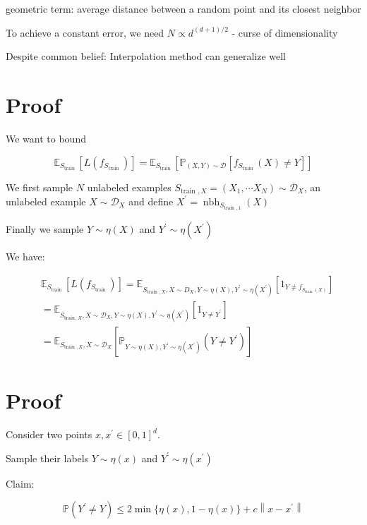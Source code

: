 \documentclass[10pt]{article}
\begin{document}
geometric term: average distance between a random point and its closest neighbor

To achieve a constant error, we need $N \propto d^{(d+1) / 2}$ - curse of dimensionality

Despite common belief: Interpolation method can generalize well

\section*{Proof}
We want to bound

$$
\mathbb{E}_{S_{\text {train }}}\left[L\left(f_{S_{\text {train }}}\right)\right]=\mathbb{E}_{S_{\text {train }}}\left[\mathbb{P}_{(X, Y) \sim \mathscr{D}}\left[f_{S_{\text {train }}}(X) \neq Y\right]\right]
$$

We first sample $N$ unlabeled examples $S_{\text {train }, X}=\left(X_{1}, \cdots X_{N}\right) \sim \mathscr{D}_{X}$, an unlabeled example $X \sim \mathscr{D}_{X}$ and define $X^{\prime}=\operatorname{nbh}_{S_{\text {train }, 1}}(X)$

Finally we sample $Y \sim \eta(X)$ and $Y^{\prime} \sim \eta\left(X^{\prime}\right)$

We have:

$$
\begin{aligned}
& \mathbb{E}_{S_{\text {train }}}\left[L\left(f_{S_{\text {train }}}\right)\right]=\mathbb{E}_{S_{\text {train }, X}, X \sim D_{X}, Y \sim \eta(X), Y^{\prime} \sim \eta\left(X^{\prime}\right)}\left[1_{Y \neq f_{S_{\text {train }}(X)}}\right] \\
& =\mathbb{E}_{S_{\text {train, } X}, X \sim \mathscr{D}_{X}, Y \sim \eta(X), Y^{\prime} \sim \eta\left(X^{\prime}\right)}\left[1_{Y \neq Y^{\prime}}\right] \\
& =\mathbb{E}_{S_{\text {train }, X}, X \sim \mathscr{D}_{X}}\left[\mathbb{P}_{Y \sim \eta(X), Y^{\prime} \sim \eta\left(X^{\prime}\right)}\left(Y \neq Y^{\prime}\right)\right]
\end{aligned}
$$

\section*{Proof}
Consider two points $x, x^{\prime} \in[0,1]^{d}$.

Sample their labels $Y \sim \eta(x)$ and $Y^{\prime} \sim \eta\left(x^{\prime}\right)$

Claim:

$$
\mathbb{P}\left(Y^{\prime} \neq Y\right) \leq 2 \min \{\eta(x), 1-\eta(x)\}+c\left\|x-x^{\prime}\right\|
$$
\end{document}
